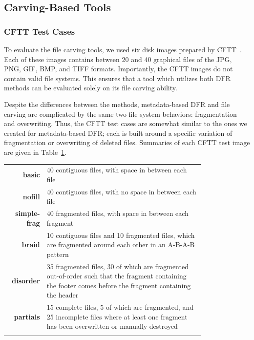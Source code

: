 \subsection{Carving-Based Tools}

\subsubsection{CFTT Test Cases}
To evaluate the file carving tools, we used six disk images prepared by CFTT~\cite{cftt_carving_images}.
Each of these images contains between 20 and 40 graphical files of the JPG, PNG, GIF, BMP, and TIFF formats.
Importantly, the CFTT images do not contain valid file systems.
This ensures that a tool which utilizes both DFR methods can be evaluated solely on its file carving ability.

Despite the differences between the methods, metadata-based DFR and file carving are complicated by the same two file system behaviors: fragmentation and overwriting. Thus, the CFTT test cases are somewhat similar to the ones we created for metadata-based DFR; each is built around a specific variation of fragmentation or overwriting of deleted files.
Summaries of each CFTT test image are given in Table~\ref{carve_cases}.

\begin{table}[ht!]
{\begin{tabular*}{\textwidth}{@{}rp{0.8\linewidth}@{}} \toprule
\textbf{basic} & 40 contiguous files, with space in between each file \\
\textbf{nofill} & 40 contiguous files, with no space in between each file \\
\textbf{simple-frag} & 40 fragmented files, with space in between each fragment \\
\textbf{braid} & 10 contiguous files and 10 fragmented files, which are fragmented around each other in an A-B-A-B pattern \\
\textbf{disorder} & 35 fragmented files, 30 of which are fragmented out-of-order such that the fragment containing the footer comes before the fragment containing the header \\
\textbf{partials} & 15 complete files, 5 of which are fragmented, and 25 incomplete files where at least one fragment has been overwritten or manually destroyed \\
\botrule
\end{tabular*}}
\label{carve_cases}
\end{table}



